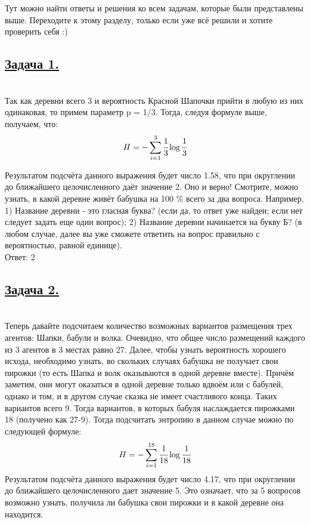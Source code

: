 Тут можно найти ответы и решения ко всем задачам, которые были представлены выше. Переходите к этому разделу, только если уже всё решили и хотите проверить себя :)

\subsection*{\hyperref[sec:problem1]{Задача 1.}}
\label{sec:sol_problem1}\
\\

Так как деревни всего 3 и вероятность Красной Шапочки прийти в любую из них одинаковая, то примем параметр p = 1/3. Тогда, следуя формуле выше, получаем, что:
\[H=-\sum\limits_{i=1}^3 \cfrac{1}{3}\log \cfrac{1}{3} \]

Результатом подсчёта данного выражения будет число 1.58, что при округлении до ближайшего целочисленного даёт значение 2. Оно и верно! Смотрите, можно узнать, в какой деревне живёт бабушка на 100 \%  всего за два вопроса. 
Например, 1) Название деревни - это гласная буква? (если да, то ответ уже найден; если нет следует задать еще один вопрос); 2) Название деревни начинается на букву Б? (в любом случае, далее вы уже сможете ответить на вопрос правильно с вероятностью, равной единице). \\

Ответ: 2
\subsection*{\hyperref[sec:problem2]{Задача 2.}}
\label{sec:sol_problem2}\
\\

Теперь давайте подсчитаем количество возможных вариантов размещения трех агентов: Шапки, бабули и волка. Очевидно, что общее число размещений каждого из 3 агентов в 3 местах равно 27. 
Далее, чтобы узнать вероятность хорошего исхода, необходимо узнать, во скольких случаях бабушка не получает свои пирожки (то есть Шапка и волк оказываются в одной деревне вместе). Причём заметим, они могут оказаться в одной деревне только вдвоём или с бабулей, однако и том, и в другом случае сказка не имеет счастливого конца. Таких вариантов всего 9. Тогда вариантов, в которых бабуля наслаждается пирожками 18 (получено как 27-9).
Тогда подсчитать энтропию в данном случае можно по следующей формуле:
\[H=-\sum\limits_{i=1}^{18}  \cfrac{1}{18}\log \cfrac{1}{18} \]
Результатом подсчёта данного выражения будет число 4.17, что при округлении до ближайшего целочисленного дает значение 5. Это означает, что за 5 вопросов возможно узнать, получила ли бабушка свои пирожки и в какой деревне она находится. \\ 

